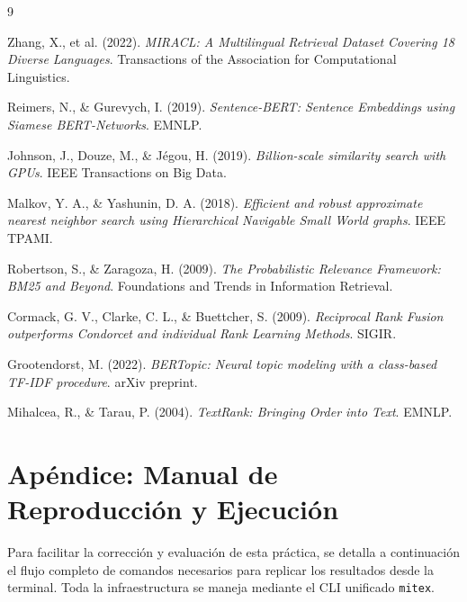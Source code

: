\documentclass[11pt,a4paper]{article}
\newcommand{\code}[1]{\texttt{#1}}
\begin{document}
\begin{thebibliography}{9}

Zhang, X., et al. (2022). \textit{MIRACL: A Multilingual Retrieval Dataset Covering 18 Diverse Languages}. Transactions of the Association for Computational Linguistics.

Reimers, N., \& Gurevych, I. (2019). \textit{Sentence-BERT: Sentence Embeddings using Siamese BERT-Networks}. EMNLP.

Johnson, J., Douze, M., \& Jégou, H. (2019). \textit{Billion-scale similarity search with GPUs}. IEEE Transactions on Big Data.

Malkov, Y. A., \& Yashunin, D. A. (2018). \textit{Efficient and robust approximate nearest neighbor search using Hierarchical Navigable Small World graphs}. IEEE TPAMI.

Robertson, S., \& Zaragoza, H. (2009). \textit{The Probabilistic Relevance Framework: BM25 and Beyond}. Foundations and Trends in Information Retrieval.

Cormack, G. V., Clarke, C. L., \& Buettcher, S. (2009). \textit{Reciprocal Rank Fusion outperforms Condorcet and individual Rank Learning Methods}. SIGIR.

Grootendorst, M. (2022). \textit{BERTopic: Neural topic modeling with a class-based TF-IDF procedure}. arXiv preprint.

Mihalcea, R., \& Tarau, P. (2004). \textit{TextRank: Bringing Order into Text}. EMNLP.

\end{thebibliography}

\newpage
\appendix
\section{Apéndice: Manual de Reproducción y Ejecución}

Para facilitar la corrección y evaluación de esta práctica, se detalla a continuación el flujo completo de comandos necesarios para replicar los resultados desde la terminal. Toda la infraestructura se maneja mediante el CLI unificado \code{mitex}.
\end{document}
